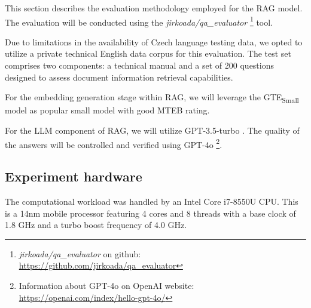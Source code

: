 This section describes the evaluation methodology employed for the \ac{RAG} model.
The evaluation will be conducted using the \textit{jirkoada/qa\_evaluator} \footnote {\textit{jirkoada/qa\_evaluator} on github: \url{https://github.com/jirkoada/qa_evaluator}} tool.

Due to limitations in the availability of Czech language testing data, we opted to utilize a private technical English data corpus for this evaluation.
The test set comprises two components: a technical manual and a set of 200 questions designed to assess document information retrieval capabilities.

For the embedding generation stage within \ac{RAG}, we will leverage the GTE\textsubscript{Small} model as popular small model with good \ac{MTEB} rating.

For the \ac{LLM} component of \ac{RAG}, we will utilize GPT-3.5-turbo \cite{brown2020language}.
The quality of the answers will be controlled and verified using GPT-4o \footnote{Information about GPT-4o on OpenAI website: \url{https://openai.com/index/hello-gpt-4o/}}.



\subsection{Experiment hardware}
The computational workload was handled by an Intel Core i7-8550U CPU.
This is a 14nm mobile processor featuring 4 cores and 8 threads with a base clock of 1.8 GHz and a turbo boost frequency of 4.0 GHz.



